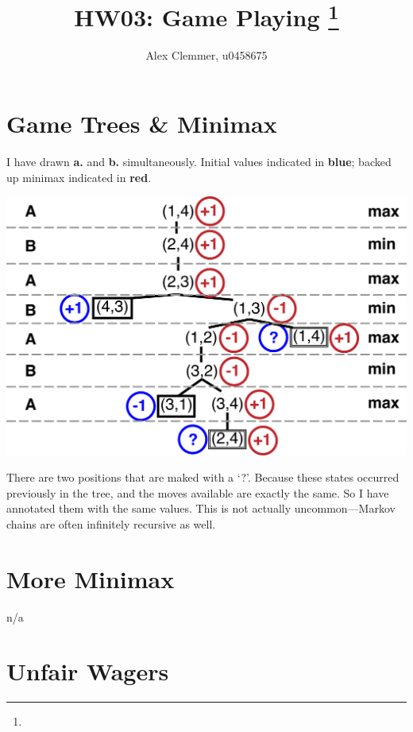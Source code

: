 \documentclass[11pt]{article}
\title{HW03: Game Playing
\footnote{\s{CS 5300 AI; \;\; Spring 2012 \hfill
Instructor: Jur van den Berg, University of Utah}
}
}
\author{Alex Clemmer, u0458675}
\begin{document}
\maketitle





\section{Game Trees \& Minimax}

I have drawn \textbf{a.} and \textbf{b.} simultaneously. Initial values indicated in \textbf{blue}; backed up minimax indicated in \textbf{red}.

\begin{center}
\includegraphics[scale=0.5]{tree.png}
\end{center}

There are two positions that are maked with a `?'. Because these states occurred previously in the tree, and the moves available are exactly the same. So I have annotated them with the same values. This is not actually uncommon---Markov chains are often infinitely recursive as well.


\section{More Minimax}

n/a




\section{Unfair Wagers}
\end{document}
